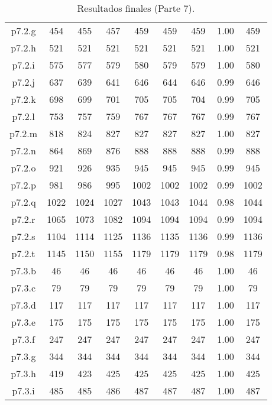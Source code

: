 \begin{table}
\begin{center}
\begin{tabular}{ |c|c|c|c|c|c|c|c|c| }
p7.2.g & 454 & 455 & 457 & 459 & 459 & 459 & 1.00 & 459 \\
p7.2.h & 521 & 521 & 521 & 521 & 521 & 521 & 1.00 & 521 \\
p7.2.i & 575 & 577 & 579 & 580 & 579 & 579 & 1.00 & 580 \\
p7.2.j & 637 & 639 & 641 & 646 & 644 & 646 & 0.99 & 646 \\
p7.2.k & 698 & 699 & 701 & 705 & 705 & 704 & 0.99 & 705 \\
p7.2.l & 753 & 757 & 759 & 767 & 767 & 767 & 0.99 & 767 \\
p7.2.m & 818 & 824 & 827 & 827 & 827 & 827 & 1.00 & 827 \\
p7.2.n & 864 & 869 & 876 & 888 & 888 & 888 & 0.99 & 888 \\
p7.2.o & 921 & 926 & 935 & 945 & 945 & 945 & 0.99 & 945 \\
p7.2.p & 981 & 986 & 995 & 1002 & 1002 & 1002 & 0.99 & 1002 \\
p7.2.q & 1022 & 1024 & 1027 & 1043 & 1043 & 1044 & 0.98 & 1044 \\
p7.2.r & 1065 & 1073 & 1082 & 1094 & 1094 & 1094 & 0.99 & 1094 \\
p7.2.s & 1104 & 1114 & 1125 & 1136 & 1135 & 1136 & 0.99 & 1136 \\
p7.2.t & 1145 & 1150 & 1155 & 1179 & 1179 & 1179 & 0.98 & 1179 \\
p7.3.b & 46 & 46 & 46 & 46 & 46 & 46 & 1.00 & 46 \\
p7.3.c & 79 & 79 & 79 & 79 & 79 & 79 & 1.00 & 79 \\
p7.3.d & 117 & 117 & 117 & 117 & 117 & 117 & 1.00 & 117 \\
p7.3.e & 175 & 175 & 175 & 175 & 175 & 175 & 1.00 & 175 \\
p7.3.f & 247 & 247 & 247 & 247 & 247 & 247 & 1.00 & 247 \\
p7.3.g & 344 & 344 & 344 & 344 & 344 & 344 & 1.00 & 344 \\
p7.3.h & 419 & 423 & 425 & 425 & 425 & 425 & 1.00 & 425 \\
p7.3.i & 485 & 485 & 486 & 487 & 487 & 487 & 1.00 & 487 \\
\hline
\end{tabular}
\end{center}
\caption{Resultados finales (Parte 7).}
\label{tab:resultadosFinales7}
\end{table}


